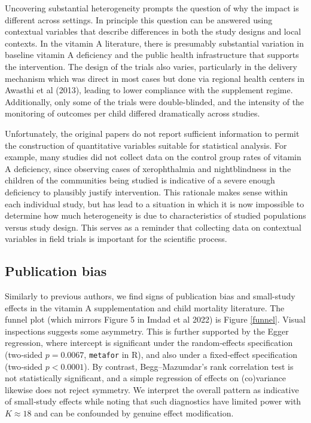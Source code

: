 \documentclass[12pt]{article}
\begin{document}
Uncovering substantial heterogeneity prompts the question of why the impact is different across settings. In principle this question can be answered using contextual variables that describe differences in both the study designs and local contexts. In the vitamin A literature, there is presumably substantial variation in baseline vitamin A deficiency and the public health infrastructure that supports the intervention. The design of the trials also varies, particularly in the delivery mechanism which was direct in most cases but done via regional health centers in Awasthi et al (2013), leading to lower compliance with the supplement regime. Additionally, only some of the trials were double-blinded, and the intensity of the monitoring of outcomes per child differed dramatically across studies. 

Unfortunately, the original papers do not report sufficient information to permit the construction of quantitative variables suitable for statistical analysis. For example, many studies did not collect data on the control group rates of vitamin A deficiency, since observing cases of xerophthalmia and nightblindness in the children of the communities being studied is indicative of a severe enough deficiency to plausibly justify intervention. This rationale makes sense within each individual study, but has lead to a situation in which it is now impossible to determine how much heterogeneity is due to characteristics of studied populations versus study design. This serves as a reminder that collecting data on contextual variables in field trials is important for the scientific process. 


\subsection{Publication bias}

Similarly to previous authors, we find signs of publication bias and small-study effects in the vitamin A supplementation and child mortality literature. The funnel plot (which mirrors Figure 5 in Imdad et al 2022) is Figure \ref{funnel}. Visual inspections suggests some asymmetry.
This is further supported by the Egger regression, where intercept is significant under the random‐effects specification (two‐sided \(p=0.0067\), \texttt{metafor} in \textsf{R}), and also under a fixed‐effect specification (two‐sided \(p<0.0001\)). By contrast, Begg–Mazumdar’s rank correlation test is not statistically significant, and a simple regression of effects on (co)variance likewise does not reject symmetry. We interpret the overall pattern as indicative of small‐study effects while noting that such diagnostics have limited power with \(K\approx 18\) and can be confounded by genuine effect modification.
\end{document}
